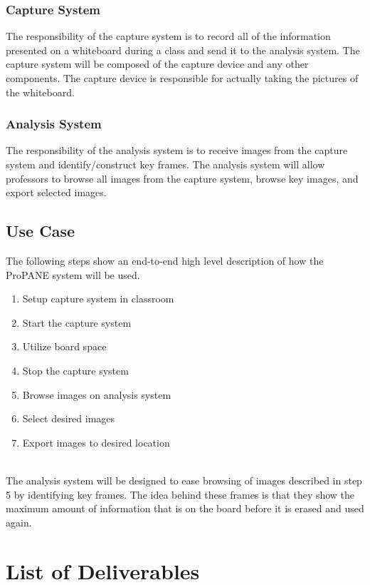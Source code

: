 \documentclass[]{article}
\begin{document}
			\subsubsection{Capture System}
				The responsibility of the capture system is to record all of the information presented on a whiteboard during a class and send it to the analysis system. The capture system will be composed of the capture device and any other components. The capture device is responsible for actually taking the pictures of the whiteboard.
				
			\subsubsection{Analysis System}
				The responsibility of the analysis system is to receive images from the capture system and identify/construct key frames. The analysis system will allow professors to browse all images from the capture system, browse key images, and export selected images. 
			
		\subsection{Use Case}
			The following steps show an end-to-end high level description of how the ProPANE system will be used.
			\begin{enumerate}
				\item Setup capture system in classroom
				\item Start the capture system
				\item Utilize board space
				\item Stop the capture system 
				\item Browse images on analysis system
				\item Select desired images
				\item Export images to desired location
			\end{enumerate}			
			\\
			The analysis system will be designed to ease browsing of images described in step 5 by identifying key frames. The idea behind these frames is that they show the maximum amount of information that is on the board before it is erased and used again. 
	
	\section{List of Deliverables}
		
\end{document}
